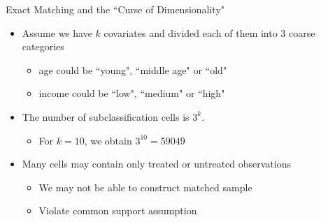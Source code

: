 \documentclass[hyperref={pdfpagelabels=false}]{beamer}
\begin{document}
\begin{frame}{Exact Matching and the ``Curse of Dimensionality"}
	\begin{itemize}
		\item Assume we have $k$ covariates and divided each of them into 3 coarse categories 
		\vspace{0.2cm}
		\begin{itemize}
			\item age could be ``young", ``middle age" or ``old"
			\vspace{0.2cm}
			\item income could be ``low", ``medium" or ``high"
		\end{itemize}
		\vspace{0.2cm}
		\item The number of subclassification cells is $3^k$. 
		\begin{itemize}
			\vspace{0.2cm}
			\item For $k=10$, we obtain $3^{10}=59049$
		\end{itemize}
		\vspace{0.2cm}
		\item Many cells may contain only treated or untreated observations
		\vspace{0.2cm}
		\begin{itemize}
			\item We may not be able to construct matched sample
			\vspace{0.2cm}
			\item Violate common support assumption
		\end{itemize}
		
		
		
		
	\end{itemize}
\end{frame}
\end{document}
